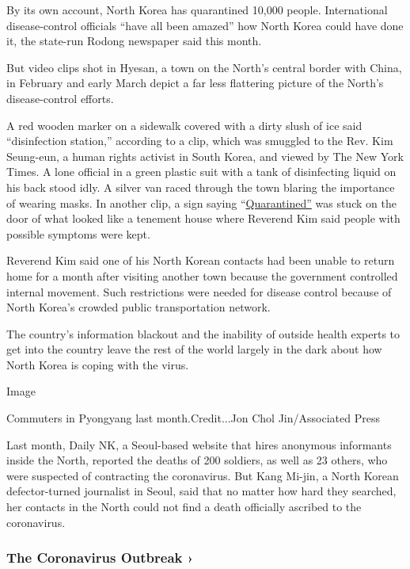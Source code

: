 By its own account, North Korea has quarantined 10,000 people.
International disease-control officials ``have all been amazed'' how
North Korea could have done it, the state-run Rodong newspaper said this
month.

But video clips shot in Hyesan, a town on the North's central border
with China, in February and early March depict a far less flattering
picture of the North's disease-control efforts.

A red wooden marker on a sidewalk covered with a dirty slush of ice said
``disinfection station,'' according to a clip, which was ​smuggled to
the Rev. Kim Seung-eun, a human rights activist in South Korea, and
viewed by The New York Times. A lone official in a green plastic suit
with a tank of disinfecting liquid on his back stood idly. A silver van
raced through the town blaring the importance of wearing masks. In
another clip, a sign saying
``\href{https://www.youtube.com/watch?v=O4dY4hwjJnM}{Quarantined''} was
stuck on the door of what looked like a tenement house where Reverend
Kim said people with possible ​symptoms were kept.

Reverend Kim said ​one of his North Korean contacts ​had been unable to
return home for a month after visiting ​another town because the
government​ controlled internal movement. Such restrictions were needed
for disease control because of North Korea's crowded public
transportation network.

The country's information blackout and the inability of outside health
experts to get into the country leave the rest of the world largely in
the dark about how North Korea is coping with the virus.

Image

Commuters in Pyongyang last month.Credit...Jon Chol Jin/Associated Press

Last month, Daily NK, a Seoul-based website ​that ​hires anonymous
informants inside ​the ​​North, reported the deaths of 200 soldiers, as
well as 23 others, who were suspected of contracting the coronavirus.
B​ut ​Kang Mi-jin, a North Korean defector-turned journalist in Seoul,
said that no matter how hard they searched, her contacts in ​the ​North
could not find a death officially ascribed to the coronavirus.

\href{https://www.nytimes3xbfgragh.onion/news-event/coronavirus?action=click\&pgtype=Article\&state=default\&region=MAIN_CONTENT_3\&context=storylines_faq}{}

\hypertarget{the-coronavirus-outbreak-}{%
\subsubsection{The Coronavirus Outbreak
›}\label{the-coronavirus-outbreak-}}

